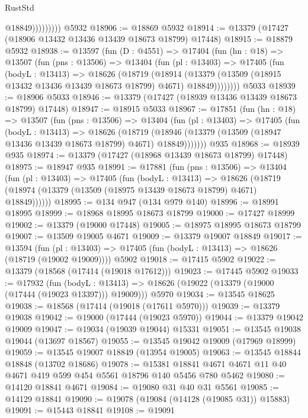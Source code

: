 \begin{lexlean}{RustStd}
\begin{coremodule}
                      @18849)))))))))
    @5932
@18906 := @18869 @5932
@18914 := @13379 (@17427 (@18906 @13432 @13436 @13439 @18673 @18799) @17448)
@18915 := @18879 @5932
@18938 := @13597
    (fun (D : @4551) =>
    @17404
      (fun (hn : @18) =>
      @13507
        (fun (pns : @13506) =>
        @13404
          (fun (pl : @13403) =>
          @17405
            (fun (bodyL : @13413) =>
            @18626
              (@18719
                (@18914
                  (@13379 (@13509 (@18915 @13432 @13436 @13439 @18673 @18799) @4671) @18849))))))))
    @5033
@18939 := @18906 @5033
@18946 := @13379 (@17427 (@18939 @13436 @13439 @18673 @18799) @17448)
@18947 := @18915 @5033
@18967 := @17851
    (fun (hn : @18) =>
    @13507
      (fun (pns : @13506) =>
      @13404
        (fun (pl : @13403) =>
        @17405
          (fun (bodyL : @13413) =>
          @18626
            (@18719
              (@18946 (@13379 (@13509 (@18947 @13436 @13439 @18673 @18799) @4671) @18849)))))))
    @935
@18968 := @18939 @935
@18974 := @13379 (@17427 (@18968 @13439 @18673 @18799) @17448)
@18975 := @18947 @935
@18991 := @17881
    (fun (pns : @13506) =>
    @13404
      (fun (pl : @13403) =>
      @17405
        (fun (bodyL : @13413) =>
        @18626 (@18719 (@18974 (@13379 (@13509 (@18975 @13439 @18673 @18799) @4671) @18849))))))
@18995 := @134 @947 (@134 @979 @140)
@18996 := @18991 @18995
@18999 := @18968 @18995 @18673 @18799
@19000 := @17427 @18999
@19002 := @13379 (@19000 @17448)
@19005 := @18975 @18995 @18673 @18799
@19007 := @13509 @19005 @4671
@19009 := @13379 @19007 @18849
@19017 := @13594
    (fun (pl : @13403) => @17405 (fun (bodyL : @13413) => @18626 (@18719 (@19002 @19009))))
    @5902
@19018 := @17415 @5902
@19022 := @13379 (@18568 (@17414 (@19018 @17612)))
@19023 := @17445 @5902
@19033 := @17932
    (fun (bodyL : @13413) => @18626 (@19022 (@13379 (@19000 (@17444 (@19023 @13397))) @19009)))
    @5970
@19034 := @13545 @18625
@19038 := @18568 (@17414 (@19018 (@17611 @5970)))
@19039 := @13379 @19038
@19042 := @19000 (@17444 (@19023 @5970))
@19044 := @13379 @19042 @19009
@19047 := @19034 (@19039 @19044) @15331
@19051 := @13545 @19038 @19044 (@13697 @18567)
@19055 := @13545 @19042 @19009 (@17969 @18999)
@19059 := @13545 @19007 @18849 (@13954 @19005)
@19063 := @13545 @18844 @18848 (@13702 @18686)
@19078 := @15381 @18841 @4671 @4671 @11 @40 @4671 @419 @599 @454 @5561 @18796 @140 @5456 @780 @5462
@19080 := @14120 @18841 @4671
@19084 := @19080 @31 @40 @31 @5561
@19085 := @14129 @18841
@19090 := @19078 (@19084 (@14128 (@19085 @31)) @15883)
@19091 := @15443 @18841
@19108 := @19091

\end{coremodule}
\end{lexlean}
